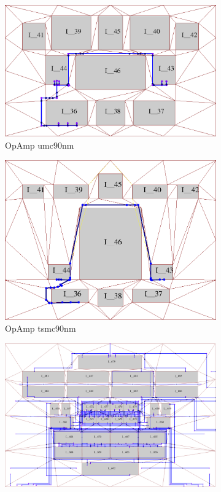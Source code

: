     \begin{figure}[ht]
        \centering
          \begin{subfigure}[t]{0.4\textwidth}
          \includegraphics[width=\textwidth]{Fig/OrigOpamp.eps}
          \caption{OpAmp umc90nm}\label{fig:OrigOpamp}
          \end{subfigure}
          \begin{subfigure}[t]{0.4\textwidth}
          \includegraphics[width=\textwidth]{Fig/OpampProto.eps}
          \caption{OpAmp tsmc90nm}\label{fig:OpampProto}
          \end{subfigure}
          \begin{subfigure}[t]{0.4\textwidth}
          \includegraphics[width=\textwidth]{Fig/OrigVGA.eps}

\end{subfigure}
\end{figure}
